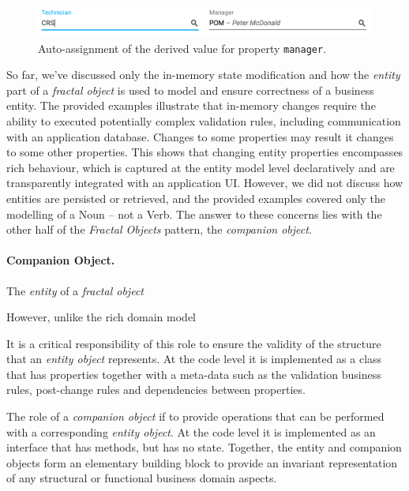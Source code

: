 \documentclass[a4paper,12pt,oneside,openright,final]{memoir} %
\begin{document}
	\begin{figure}[!h]
  		\centering
      	\includegraphics[width=1.0\textwidth]{images/05-wa-technician-entered.png}  
   	  	\caption{Auto-assignment of the derived value for property \texttt{manager}.}
   		\label{fig:derived-manager}
  	\end{figure}
	
	
	So far, we've discussed only the in-memory state modification and how the \emph{entity} part of a \emph{fractal object} is used to model and ensure correctness of a business entity.
	The provided examples illustrate that in-memory changes require the ability to executed potentially complex validation rules, including communication with an application database.
	Changes to some properties may result it changes to some other properties.
	This shows that changing entity properties encompasses rich behaviour, which is captured at the entity model level declaratively and are transparently integrated with an application UI.
	However, we did not discuss how entities are persisted or retrieved, and the provided examples covered only the modelling of a Noun -- not a Verb.
	The answer to these concerns lies with the other half of the \emph{Fractal Objects} pattern, the \emph{companion object}.

	\paragraph{Companion Object.}	
	The \emph{entity} of a \emph{fractal object}
	
	However, unlike the rich domain model
	
		
	It is a critical responsibility of this role to ensure the validity of the structure that an \emph{entity object} represents.
  	At the code level it is implemented as a class that has properties together with a meta-data such as the validation business rules, post-change rules and dependencies between properties.
	
	
	
	
  	The role of a \emph{companion object} if to provide operations that can be performed with a corresponding \emph{entity object}.
  	At the code level it is implemented as an interface that has methods, but has no state.
  	Together, the entity and companion objects form an elementary building block to provide an invariant representation of any structural or functional business domain aspects.
\end{document}
